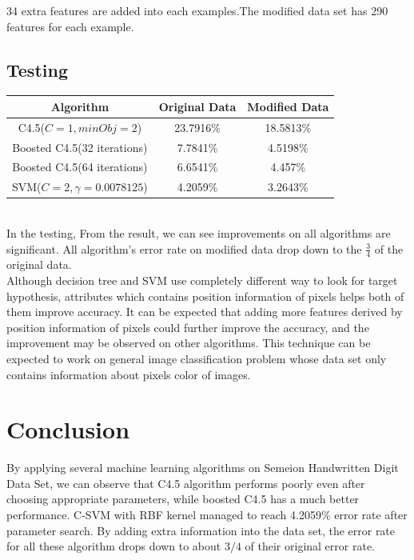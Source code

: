 \documentclass[a4paper,11pt]{article}
\begin{document}
34 extra features are added into each examples.The modified data set has 290 features for each example.
\subsection{Testing}
\vspace{0.5cm}
\begin{tabular}{c c c}
Algorithm		&	Original Data	&Modified Data\\
\hline \hline
C4.5($C=1, minObj=2$)           &23.7916\%		& 18.5813\%\\
Boosted C4.5(32 iterations)	    &7.7841\%		& 4.5198\%\\
Boosted C4.5(64 iterations)	    &6.6541\%		& 4.457\%\\
SVM($C=2, \gamma=0.0078125$)	&4.2059\%       & 3.2643\%\\
\end{tabular}
\vspace{0.5cm}\\
In the testing, From the result, we can see improvements on all algorithms are significant. All algorithm's error rate on modified data drop down to the $\frac{3}{4}$ of the original data.\\
Although decision tree and SVM use completely different way to look for target hypothesis, attributes which contains position information of pixels helps both of them improve accuracy. It can be expected that adding more features derived by position information of pixels could further improve the accuracy, and the improvement may be observed on other algorithms. This technique can be expected to work on general image classification problem whose data set only contains information about pixels color of images.

\section{Conclusion}
By applying several machine learning algorithms on Semeion Handwritten Digit Data Set, we can observe that C4.5 algorithm performs poorly even after choosing appropriate parameters, while boosted C4.5 has a much better performance. C-SVM with RBF kernel managed to reach 4.2059\% error rate after parameter search. By adding extra information into the data set, the error rate for all these algorithm drops down to about $3/4$ of their original error rate.



\end{document}
